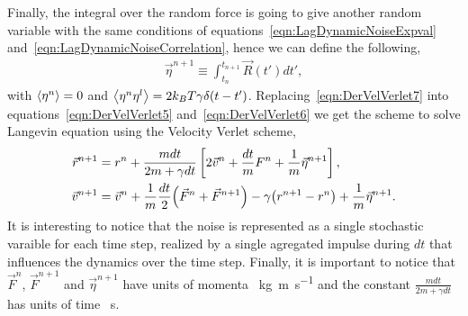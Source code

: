 Finally, the integral over the random force is going to give another random variable with the same conditions of equations~\eqref{eqn:LagDynamicNoiseExpval} and~\eqref{eqn:LagDynamicNoiseCorrelation}, hence we can define the following,
\begin{gather}
    \vec{\eta}^{n+1}\equiv\int_{t_n}^{t_{n+1}}\vec{R}(t')dt'\label{eqn:DerVelVerlet7},
\end{gather}
with $\expval{\eta^{n}}=0$ and $\expval{\eta^{n}\eta^{l}}=2k_{B}T\gamma\delta\qty(t-t')$.
Replacing~\eqref{eqn:DerVelVerlet7} into equations~\eqref{eqn:DerVelVerlet5} and~\eqref{eqn:DerVelVerlet6} we get the scheme to solve Langevin equation using the Velocity Verlet scheme,
\begin{align}
    \vec{r}^{n+1} &= r^n
                    +\frac{m dt}{2m +\gamma dt}\left[ 
                        2\vec{v}^{n}                
                        +\frac{dt}{m}F^{n}
                        +\frac{1}{m}\vec{\eta}^{n+1}
                    \right]\label{eqn:DerVelVerlet5}
                    , \\
    \vec{v}^{n+1} &= \vec{v}^{n}
                     +\frac{1}{m}\frac{dt}{2}\qty(\vec{F}^{n} + \vec{F}^{n+1})
                     -\gamma\qty(r^{n+1}-r^n)
                     +\frac{1}{m}\vec{\eta}^{n+1}\label{eqn:DerVelVerlet6}.
\end{align}
It is interesting to notice that the noise is represented as a single stochastic varaible for each time step, realized by a single agregated impulse during $dt$ that influences the dynamics over the time step.
Finally, it is important to notice that $\vec{F}^{n}$, $\vec{F}^{n+1}$ and $\vec{\eta}^{n+1}$ have units of momenta \SI{}{\kilo\gram\meter\per\second} and the constant $\frac{m dt}{2m +\gamma dt}$ has units of time \SI{}{\second}. 

